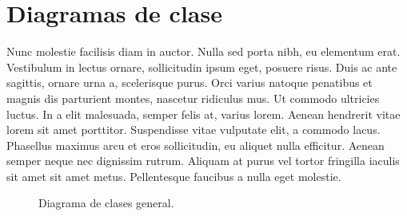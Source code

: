 \documentclass[../informe.tex]{subfiles}
\begin{document}
\section{Diagramas de clase}\label{sec:diagramasdeclase}

Nunc molestie facilisis diam in auctor. Nulla sed porta nibh, eu elementum erat. Vestibulum in lectus ornare, sollicitudin ipsum eget, posuere risus. Duis ac ante sagittis, ornare urna a, scelerisque purus. Orci varius natoque penatibus et magnis dis parturient montes, nascetur ridiculus mus. Ut commodo ultricies luctus. In a elit malesuada, semper felis at, varius lorem. Aenean hendrerit vitae lorem sit amet porttitor. Suspendisse vitae vulputate elit, a commodo lacus. Phasellus maximus arcu et eros sollicitudin, eu aliquet nulla efficitur. Aenean semper neque nec dignissim rutrum. Aliquam at purus vel tortor fringilla iaculis sit amet sit amet metus. Pellentesque faucibus a nulla eget molestie.

\begin{figure}[H]
    \centering
    
    \caption{\label{dcGeneral}Diagrama de clases general.}
\end{figure}


\end{document}
